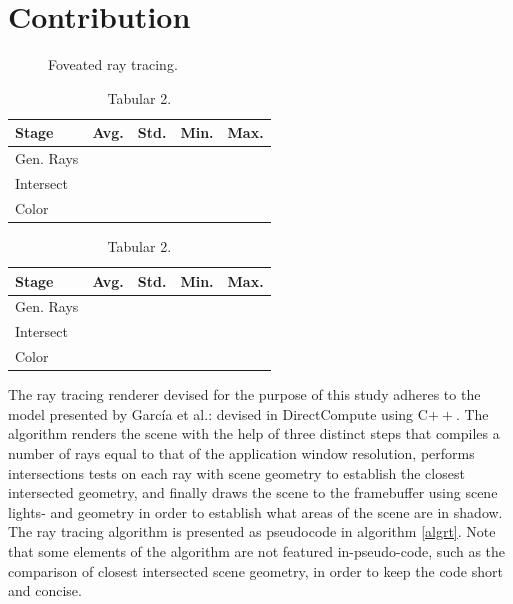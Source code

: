
\section{Contribution}

\begin{figure}
\parbox{.5\linewidth}{%
\centering%
\caption{Non-foveated ray tracing.}
\label{fig:histogram_non-foveated}
}
\hfill%
\parbox{.5\linewidth}{%
\centering%
\caption{Foveated ray tracing.}
\label{fig:histogram_foveated}
}
\end{figure}

\begin{table}[bp]
\parbox{.5\linewidth}{
\centering
\begin{tabular}{l|llll}
Stage & Avg. & Std. & Min. & Max.     \\ \hline
Gen. Rays     &     &     &     &     \\
Intersect     &     &     &     &     \\
Color         &     &     &     &    
\end{tabular}
\caption{Tabular 1.}
\label{tab:tabular1}}
\hfill
\parbox{.5\linewidth}{
\centering
\begin{tabular}{l|llll}
Stage & Avg. & Std. & Min. & Max.     \\ \hline
Gen. Rays     &     &     &     &     \\
Intersect     &     &     &     &     \\
Color         &     &     &     &    
\end{tabular}
\caption{Tabular 2.}
\label{tab:tabular2}}
\end{table}

The ray tracing renderer devised for the purpose of this study adheres to the model presented by Garc{\'i}a et al.: devised in DirectCompute using C$++$.
The algorithm renders the scene with the help of three distinct steps that compiles a number of rays equal to that of the application window resolution, performs intersections tests on each ray with scene geometry to establish the closest intersected geometry, and finally draws the scene to the framebuffer using scene lights- and geometry in order to establish what areas of the scene are in shadow.
The ray tracing algorithm is presented as pseudocode in algorithm \ref{algrt}.
Note that some elements of the algorithm are not featured in-pseudo-code, such as the comparison of closest intersected scene geometry, in order to keep the code short and concise.

